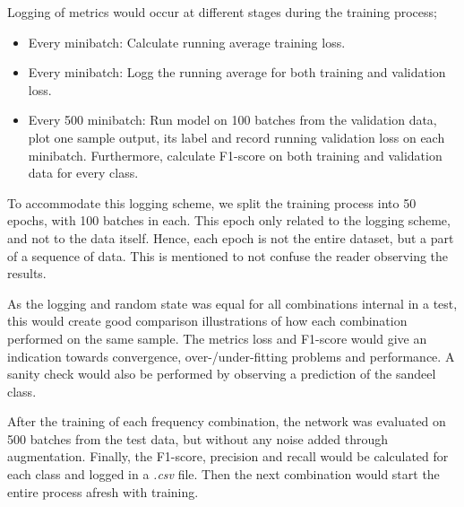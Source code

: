         Logging of metrics would occur at different stages during the training process;
            \begin{itemize}
                \item Every minibatch: Calculate running average training loss.
                \item Every minibatch: Logg the running average for both training and validation loss.
                \item Every 500 minibatch: Run model on 100 batches from the validation data, plot one sample output, its label and record running validation loss on each minibatch. Furthermore, calculate F1-score on both training and validation data for every class.
            \end{itemize}
        To accommodate this logging scheme, we split the training process into 50 epochs, with 100 batches in each. This epoch only related to the logging scheme, and not to the data itself. Hence, each epoch is not the entire dataset, but a part of a sequence of data. This is mentioned to not confuse the reader observing the results.
    
        As the logging and random state was equal for all combinations internal in a test, this would create good comparison illustrations of how each combination performed on the same sample. The metrics loss and F1-score would give an indication towards convergence, over-/under-fitting problems and performance. A sanity check would also be performed by observing a prediction of the sandeel class.
        
        After the training of each frequency combination, the network was evaluated on 500 batches from the test data, but without any noise added through augmentation. Finally, the F1-score, precision and recall would be calculated for each class and logged in a \textit{.csv} file. Then the next combination would start the entire process afresh with training.
        
